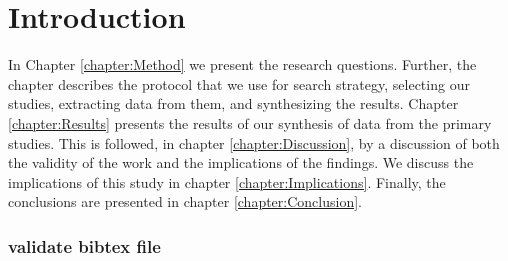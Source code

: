 \chapter{Introduction}\label{chapter:Introduction}

In Chapter \ref{chapter:Method} we present the research questions.
Further, the chapter describes the protocol that we use for search strategy, selecting our studies, extracting data from them, and synthesizing the results.
Chapter \ref{chapter:Results} presents the results of our synthesis of data from the primary studies.
This is followed, in chapter \ref{chapter:Discussion}, by a discussion of both the validity of the work and the implications of the findings.
We discuss the implications of this study in chapter \ref{chapter:Implications}.
Finally, the conclusions are presented in chapter \ref{chapter:Conclusion}. 


\subsection{validate bibtex file}
\cite{de2011rules}

\cite{erdweg2015evaluating}

\cite{gregor2006nature}

\cite{kumar2011rule}

\cite{meacham2020classification}

\cite{pavletic2013extensible}

\cite{ratiu2018automated}

\cite{voelter2019lessons}

\cite{voelter2019using}

\cite{vysoky2016grammar}

\cite{wortmann2016domain}

\cite{browne2009jboss}

\cite{kitchenham2015evidence}

\cite{mathers1998using}

\cite{voelter2013dsl}

\cite{voelter2014generic}

\cite{forgy1989rete}

\cite{kaczor2011visual}

\cite{erdweg2013state}

\cite{guttormsen2017consistent}

\cite{liu2003dios++}

\cite{live_literals}

\cite{pech2013jetbrains}

\cite{prinz2016multi}

\cite{proctor2011drools}

\cite{ratiu2017experiences}

\cite{schmidt2008blending}

\cite{voelter2014towards}

\cite{voelter2015using}

\cite{voelter2018fusing}

\cite{voelter2019shadow}

\cite{Fowler_lwb}

\cite{Java_usage_report}

\cite{MPS_ProductPage}

